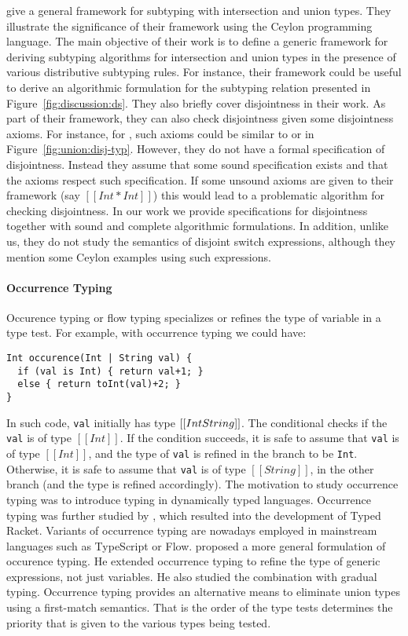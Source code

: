 \citet{muehlboeck2018empowering} give a general framework for subtyping
with intersection and union types. They illustrate the significance of
their framework using the Ceylon programming language.
The main objective of their work is to define a generic framework for
deriving subtyping algorithms for  
intersection and union types in the presence of various distributive subtyping rules.
For instance, their framework could be useful to derive an algorithmic
formulation for the subtyping relation presented in Figure~\ref{fig:discussion:ds}.
They also briefly cover disjointness in their work. As part of their framework, they
can also check disjointness given some disjointness axioms. For instance,
for \name, such axioms could be similar to  or 
in Figure~\ref{fig:union:disj-typ}. 
However, they do not have a formal
specification of disjointness. Instead they assume that some sound specification
exists and that the axioms respect such specification.
If some unsound axioms are given to their framework (say $[[Int * Int]]$) this
would lead to a problematic algorithm for checking disjointness.
In our work we provide specifications for disjointness together
with sound and complete algorithmic formulations.
In addition, unlike us,
they do not study the semantics of disjoint switch expressions,
although they mention some Ceylon examples using such expressions.

\paragraph{Occurrence Typing}
Occurence typing or flow typing \cite{tobin2008design} specializes or refines 
the type of variable in a type test. For example, with occurrence typing we
could have: 

\begin{lstlisting}
Int occurence(Int | String val) {
  if (val is Int) { return val+1; }
  else { return toInt(val)+2; }
}
\end{lstlisting}

\noindent In such code, \lstinline{val} initially has type $[[Int \/ String]]$. 
The conditional checks if the \lstinline{val} is of type $[[Int]]$.
If the condition succeeds, it is safe to assume that \lstinline{val} is of type $[[Int]]$,
and the type of \lstinline{val} is refined in the branch to be \lstinline{Int}.
Otherwise, it is safe to assume that \lstinline{val} is of type $[[String]]$, in the
other branch (and the type is refined accordingly).
The motivation to study occurrence typing was to introduce typing in dynamically
typed languages.
Occurrence typing was further studied by \cite{tobin2010logical},
which resulted into the development of Typed Racket.
Variants of occurrence typing are nowadays employed in mainstream languages
such as TypeScript or Flow.
\cite{castagna2019revisiting} proposed a more general formulation of
occurence typing. He extended occurrence typing to refine the type of
generic expressions, not just variables. He also studied the combination
with gradual typing. Occurrence typing provides an alternative
means to eliminate union types using a first-match semantics. That is the
order of the type tests determines the priority that is given to the various
types being tested.

